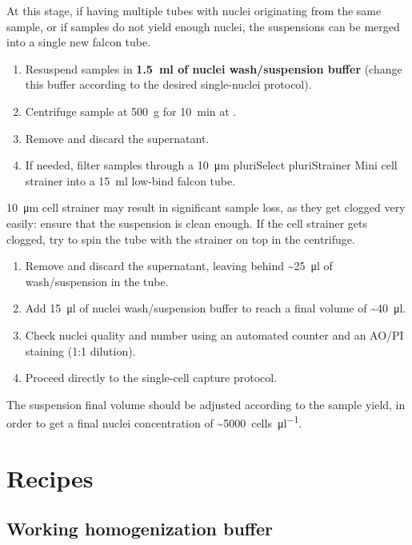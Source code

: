 \documentclass[10pt]{report}
\begin{document}
\bigskip\alert{At this stage, if having multiple tubes with nuclei originating from the same sample, or if samples do not yield enough nuclei, the suspensions can be merged into a single new falcon tube.}
	
\begin{enumerate}[resume = steps]
	\item Resuspend samples in \textbf{\qty{1.5}{\ml} of nuclei wash/suspension buffer} (change this buffer according to the desired single-nuclei protocol).
	\item Centrifuge sample at \qty{500}{\g} for \qty{10}{\minute} at \fourdegree.
	\item Remove and discard the supernatant.
	\item If needed, filter samples through a \qty{10}{\um} pluriSelect pluriStrainer Mini cell strainer into a \qty{15}{\ml} low-bind falcon tube.
\end{enumerate}

\bigskip\alert{\qty{10}{\um} cell strainer may result in significant sample loss, as they get clogged very easily: ensure that the suspension is clean enough. If the cell strainer gets clogged, try to spin the tube with the strainer on top in the \fourdegree{} centrifuge.}

\begin{enumerate}[resume = steps]
	\item Remove and discard the supernatant, leaving behind \qty{~25}{\ul} of wash/suspension in the tube.
	\item Add \qty{15}{\ul} of nuclei wash/suspension buffer to reach a final volume of \qty{~40}{\ul}.
	\item Check nuclei quality and number using an automated counter and an AO/PI staining (1:1 dilution).
	\item Proceed directly to the single-cell capture protocol.
\end{enumerate}

\bigskip\alert{The suspension final volume should be adjusted according to the sample yield, in order to get a final nuclei concentration of \qty{~5000}{cells\per\ul}}.

\clearpage

\section*{\textendash{} Recipes \textendash{}}

\subsection*{Working homogenization buffer}
\end{document}
